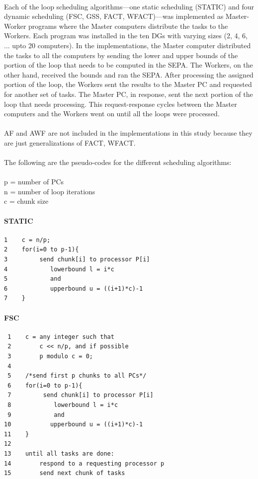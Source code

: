 \documentclass[10pt, twocolumn, letterpaper]{article}
\begin{document}
\paragraph{}
Each of the loop scheduling algorithms---one static scheduling (\textsf{STATIC}) and four dynamic scheduling (\textsf{FSC}, \textsf{GSS}, \textsf{FACT}, \textsf{WFACT})---was implemented as Master-Worker programs where the Master computers distribute the tasks to the Workers. Each program was installed in the ten DGs with varying sizes (2, 4, 6, ... upto 20 computers). In the implementations, the Master computer distributed the tasks to all the computers by sending the lower and upper bounds of the portion of the loop that needs to be computed in the SEPA. The Workers, on the other hand, received the bounds and ran the SEPA. After processing the assigned portion of the loop, the Workers sent the results to the Master PC and requested for another set of tasks. The Master PC, in response, sent the next portion of the loop that needs processing. This request-response cycles between the Master computers and the Workers went on until all the loops were processed.

\paragraph{}
AF and AWF are not included in the implementations in this study because they are just generalizations of FACT, WFACT. 

\paragraph{}
The following are the pseudo-codes for the different scheduling algorithms:\\\\
p\textsf{ = number of PCs}\\
n\textsf{ = number of loop iterations}\\
c\textsf{ = chunk size}

\paragraph{\textsf{STATIC}}
\begin{verbatim}
1    c = n/p;
2    for(i=0 to p-1){
3         send chunk[i] to processor P[i]
4            lowerbound l = i*c
5            and
6            upperbound u = ((i+1)*c)-1
7    }
\end{verbatim}

\paragraph{\textsf{FSC}}
\begin{verbatim}
 1    c = any integer such that
 2        c << n/p, and if possible
 3        p modulo c = 0;
 4
 5    /*send first p chunks to all PCs*/
 6    for(i=0 to p-1){
 7         send chunk[i] to processor P[i]
 8            lowerbound l = i*c
 9            and
10           upperbound u = ((i+1)*c)-1
11    }
12
13    until all tasks are done:
14        respond to a requesting processor p
15        send next chunk of tasks
\end{verbatim}
\end{document}
